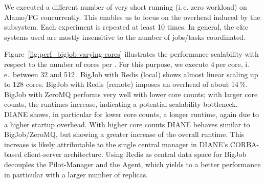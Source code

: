 \documentclass[conference]{IEEEtran}
\begin{document}




We executed a different number of very short running (i.\,e. zero workload)
\cus on Alamo/FG concurrently.  
This enables us to focus on the overhead induced by the \cc subsystem. Each
experiment is repeated at least 10 times. In general, the c\&c systems used
are mostly insensitive to the number of jobs/tasks coordinated. 

  Figure~\ref{fig:perf_bigjob-varying-cores} illustrates the performance
scalability with respect to the number of cores per \pilot. For this purpose,
we execute 4\,\cus per core, i.\,e.\ between 32 and 512\,\cus. BigJob with
Redis (local) shows almost linear scaling up to 128 cores. BigJob with Redis
(remote) imposes an overhead of about 14\,\%. BigJob with ZeroMQ performs very
well with lower core counts; with larger core counts, the runtimes increase,
indicating a potential scalability bottleneck. DIANE shows, in particular for
lower core counts, a longer runtime, again due to a higher startup overhead.
With higher core counts DIANE behaves similar to BigJob/ZeroMQ, but showing a
greater increase of the overall runtime. This increase is likely attributable
to the single central manager in DIANE's CORBA-based client-server
architecture. Using Redis as central data space for BigJob decouples the
Pilot-Manager and the Agent, which yields to a better performance in
particular with a larger number of replicas.
\end{document}
